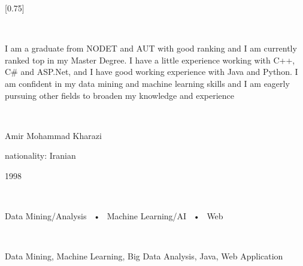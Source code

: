 \documentclass[lighthipster]{simplehipstercv}
\begin{document}
\setlength{\columnsep}{1.5cm}
[0.75]
\begin{paracol}{2}

\paracolbackgroundoptions



\footnotesize
{\setasidefontcolour
\centering
\begin{center}
\end{center}

\\[0.5em]

{\footnotesize
	\justifying
	\begin{spacing}{1.5}
		I am a graduate from NODET and AUT with good ranking and I am currently ranked top in my Master Degree. I have a little experience working with C++, C\# and ASP.Net, and I have good working experience with Java and Python. I am confident in my data mining and machine learning skills and I am eagerly pursuing other fields to broaden my knowledge and experience 
	\end{spacing}
		
	

}
\bigskip

 \\[0.5em]
\begin{spacing}{1.5}
	\justifying
Amir Mohammad Kharazi

nationality: Iranian 

1998
\end{spacing}


\bigskip

 \\[0.5em]

\begin{spacing}{1.5}
Data Mining/Analysis ~•~ Machine Learning/AI ~•~ Web
\end{spacing}



\bigskip

\\[0.5em]

\begin{spacing}{1.5}
Data Mining, Machine Learning, Big Data Analysis, Java, Web Application
\end{spacing}

}
\end{paracol}
\end{document}
